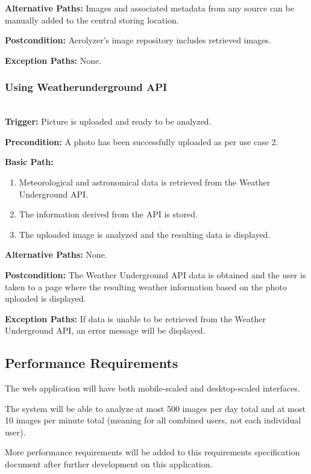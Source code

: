 \documentclass[letterpaper,10pt,draftclsnofoot,onecolumn]{IEEEtran}
\begin{document}
\begin{flushleft}
\textbf{Alternative Paths: }
Images and associated metadata from any source can be manually added to the central storing location.

\textbf{Postcondition: }
Aerolyzer's image repository includes retrieved images.

\textbf{Exception Paths: }
None.
\bigskip

\subsubsection{Using Weatherunderground API}  \ \\

\textbf{Trigger: }
Picture is uploaded and ready to be analyzed.

\textbf{Precondition: }
A photo has been successfully uploaded as per use case 2.

\textbf{Basic Path: }
\begin{enumerate}
	\item Meteorological and astronomical data is retrieved from the Weather Underground API.
	\item The information derived from the API is stored.
	\item The uploaded image is analyzed and the resulting data is displayed.
\end{enumerate}

\textbf{Alternative Paths: }
None.

\textbf{Postcondition: }
The Weather Underground API data is obtained and the user is taken to a page where the resulting weather information based on the photo uploaded is displayed.

\textbf{Exception Paths: }
If data is unable to be retrieved from the Weather Underground API, an error message will be displayed.

\bigskip


\subsection{Performance Requirements}
The web application will have both mobile-scaled and desktop-scaled interfaces.

The system will be able to analyze at most 500 images per day total and at most 10 images per minute total (meaning for all combined users, not each individual user).

More performance requirements will be added to this requirements specification document after further development on this application.


\end{flushleft}
\end{document}

